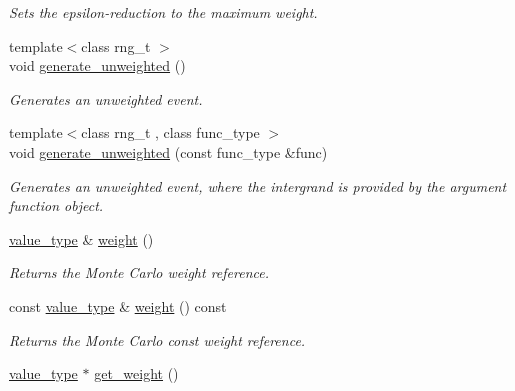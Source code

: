 \begin{DoxyCompactItemize}
\begin{DoxyCompactList}\small\item\em Sets the epsilon-\/reduction to the maximum weight. \end{DoxyCompactList}\item 
{\footnotesize template$<$class rng\-\_\-t $>$ }\\void \hyperlink{a00362_abf608b1619ea6f0c4b889281e109cca6}{generate\-\_\-unweighted} ()
\begin{DoxyCompactList}\small\item\em Generates an unweighted event. \end{DoxyCompactList}\item 
{\footnotesize template$<$class rng\-\_\-t , class func\-\_\-type $>$ }\\void \hyperlink{a00362_ae0034a35accc2f5bd53d2c1bd7e725e5}{generate\-\_\-unweighted} (const func\-\_\-type \&func)
\begin{DoxyCompactList}\small\item\em Generates an unweighted event, where the intergrand is provided by the argument function object. \end{DoxyCompactList}\item 
\hypertarget{a00362_a0d7267239ddb11ae5c4eb5df1282c163}{\hyperlink{a00362_a3353150105036deac9bde097cbf1d8af}{value\-\_\-type} \& \hyperlink{a00362_a0d7267239ddb11ae5c4eb5df1282c163}{weight} ()}\label{a00362_a0d7267239ddb11ae5c4eb5df1282c163}

\begin{DoxyCompactList}\small\item\em Returns the Monte Carlo weight reference. \end{DoxyCompactList}\item 
\hypertarget{a00362_a32830d678911518e504ebd08a5a111b8}{const \hyperlink{a00362_a3353150105036deac9bde097cbf1d8af}{value\-\_\-type} \& \hyperlink{a00362_a32830d678911518e504ebd08a5a111b8}{weight} () const }\label{a00362_a32830d678911518e504ebd08a5a111b8}

\begin{DoxyCompactList}\small\item\em Returns the Monte Carlo const weight reference. \end{DoxyCompactList}\item 
\hypertarget{a00362_a53d27df1dc66a74d54ed1ebc7006f0ec}{\hyperlink{a00362_a3353150105036deac9bde097cbf1d8af}{value\-\_\-type} $\ast$ \hyperlink{a00362_a53d27df1dc66a74d54ed1ebc7006f0ec}{get\-\_\-weight} ()}\label{a00362_a53d27df1dc66a74d54ed1ebc7006f0ec}


\end{DoxyCompactItemize}
